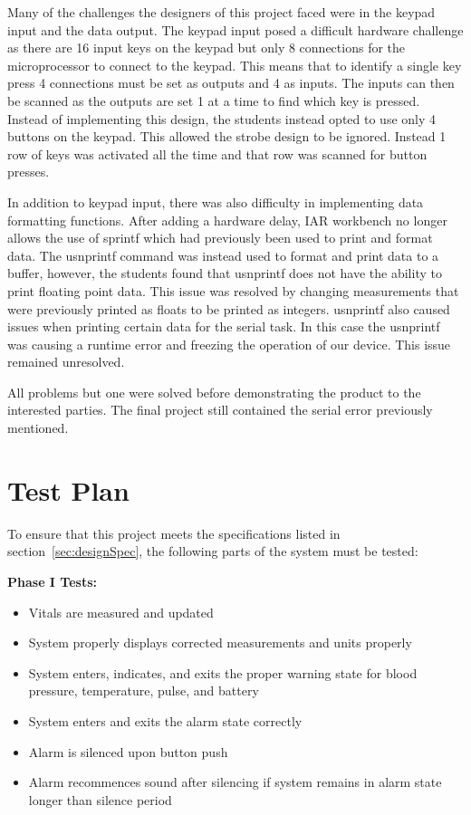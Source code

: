\documentclass[12pt]{article} %
\begin{document}
    
    Many of the challenges the designers of this project faced were in the
    keypad input and the data output. The keypad input posed a difficult
    hardware challenge as there are 16 input keys on the keypad but only 8
    connections for the microprocessor to connect to the keypad. This means
    that to identify a single key press 4 connections must be set as outputs
    and 4 as inputs. The inputs can then be scanned as the outputs are set 1 at
    a time to find which key is pressed. Instead of implementing this design,
    the students instead opted to use only 4 buttons on the keypad. This
    allowed the strobe design to be ignored. Instead 1 row of keys was
    activated all the time and that row was scanned for button presses.
    
    In addition to keypad input, there was also difficulty in implementing data
    formatting functions. After adding a hardware delay, IAR workbench no
    longer allows the use of sprintf which had previously been used to print
    and format data. The usnprintf command was instead used to format and print
    data to a buffer, however, the students found that usnprintf does not have
    the ability to print floating point data. This issue was resolved by
    changing measurements that were previously printed as floats to be printed
    as integers. usnprintf also caused issues when printing certain data for
    the serial task. In this case the usnprintf was causing a runtime error and
    freezing the operation of our device. This issue remained unresolved. 
    
    
    
    
    All problems but one were solved before demonstrating the product to the interested
    parties. The final project still contained the serial error previously mentioned.
    
    \section{Test Plan} 

    To ensure that this project meets the specifications listed in 
    section~\ref{sec:designSpec}, the following parts of the system must be 
    tested: 

		\textbf{Phase I Tests:}
    \begin{itemize}
      \item Vitals are measured and updated
      \item System properly displays corrected measurements and units properly
      \item System enters, indicates, and exits the proper warning state for
	blood pressure, temperature, pulse, and battery
      \item System enters and exits the alarm state correctly
      \item Alarm is silenced upon button push
      \item Alarm recommences sound after silencing if system remains in alarm
	state longer than silence period
    \end{itemize}
\end{document}
